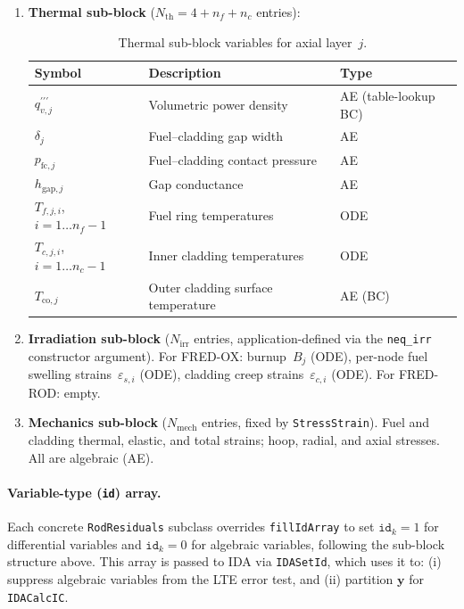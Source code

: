 \documentclass[11pt,a4paper]{article}
\begin{document}
\begin{enumerate}
  \item \textbf{Thermal sub-block} ($N_\mathrm{th} = 4 + n_f + n_c$ entries):
    \begin{table}[h]
      \centering
      \begin{tabular}{lll}
        \toprule
        Symbol & Description & Type \\
        \midrule
        $q_{v,j}^{\prime\prime\prime}$ & Volumetric power density & AE (table-lookup BC) \\
        $\delta_j$            & Fuel--cladding gap width         & AE \\
        $p_{\mathrm{fc},j}$  & Fuel--cladding contact pressure   & AE \\
        $h_{\mathrm{gap},j}$ & Gap conductance                   & AE \\
        $T_{f,j,i}$, $i=1\ldots n_f{-}1$ & Fuel ring temperatures & ODE \\
        $T_{c,j,i}$, $i=1\ldots n_c{-}1$ & Inner cladding temperatures & ODE \\
        $T_{\mathrm{co},j}$  & Outer cladding surface temperature & AE (BC) \\
        \bottomrule
      \end{tabular}
      \caption{Thermal sub-block variables for axial layer~$j$.}
      \label{tab:thermal_block}
    \end{table}

  \item \textbf{Irradiation sub-block} ($N_\mathrm{irr}$ entries, application-defined via the \texttt{neq\_irr} constructor argument). For FRED-OX: burnup~$B_j$ (ODE), per-node fuel swelling strains~$\varepsilon_{s,i}$ (ODE), cladding creep strains~$\varepsilon_{c,i}$ (ODE). For FRED-ROD: empty.

  \item \textbf{Mechanics sub-block} ($N_\mathrm{mech}$ entries, fixed by \texttt{StressStrain}). Fuel and cladding thermal, elastic, and total strains; hoop, radial, and axial stresses. All are algebraic (AE).
\end{enumerate}

\paragraph{Variable-type (\texttt{id}) array.}
Each concrete \texttt{RodResiduals} subclass overrides \texttt{fillIdArray} to set $\mathtt{id}_k = 1$ for differential variables and $\mathtt{id}_k = 0$ for algebraic variables, following the sub-block structure above.  This array is passed to IDA via \texttt{IDASetId}, which uses it to: (i) suppress algebraic variables from the LTE error test, and (ii) partition $\mathbf{y}$ for \texttt{IDACalcIC}.
\end{document}
